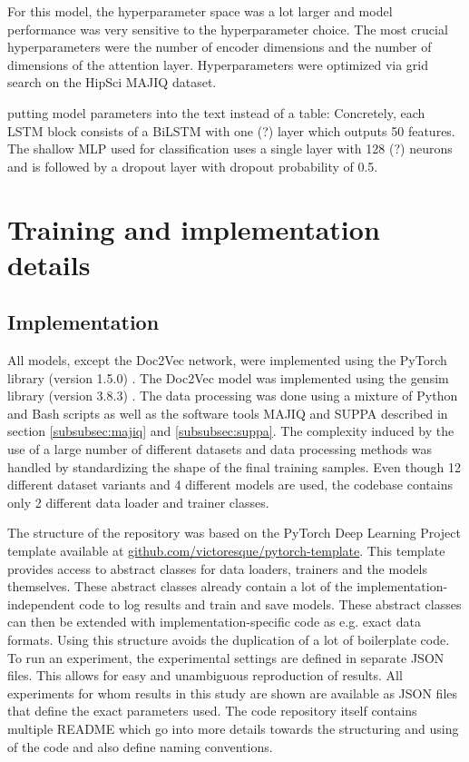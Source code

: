 For this model, the hyperparameter space was a lot larger and model performance was very sensitive to the hyperparameter choice. The most crucial hyperparameters were the number of encoder dimensions and the number of dimensions of the attention layer. Hyperparameters were optimized via grid search on the HipSci MAJIQ dataset.

putting model parameters into the text instead of a table:
Concretely, each LSTM block consists of a BiLSTM with one (?) layer which outputs 50 features.
The shallow MLP used for classification uses a single layer with 128 (?) neurons and is followed by a dropout layer with dropout probability of 0.5.


\section{Training and implementation details} \label{sec:implementation_details}
\subsection{Implementation} \label{subsec:implementation_details}
All models, except the Doc2Vec network, were implemented using the PyTorch library (version 1.5.0) \cite{pytorch}. The Doc2Vec model was implemented using the gensim library (version 3.8.3) \cite{gensim}. The data processing was done using a mixture of Python and Bash scripts as well as the software tools MAJIQ and SUPPA described in section \ref{subsubsec:majiq} and \ref{subsubsec:suppa}. The complexity induced by the use of a large number of different datasets and data processing methods was handled by standardizing the shape of the final training samples. Even though 12 different dataset variants and 4 different models are used, the codebase contains only 2 different data loader and trainer classes.


The structure of the repository was based on the PyTorch Deep Learning Project template available at \url{github.com/victoresque/pytorch-template}. This template provides access to abstract classes for data loaders, trainers and the models themselves. These abstract classes already contain a lot of the implementation-independent code to log results and train and save models. These abstract classes can then be extended with implementation-specific code as e.g. exact data formats. Using this structure avoids the duplication of a lot of boilerplate code.\\
To run an experiment, the experimental settings are defined in separate JSON files. This allows for easy and unambiguous reproduction of results. All experiments for whom results in this study are shown are available as JSON files that define the exact parameters used.
The code repository itself contains multiple README which go into more details towards the structuring and using of the code and also define naming conventions.\\


